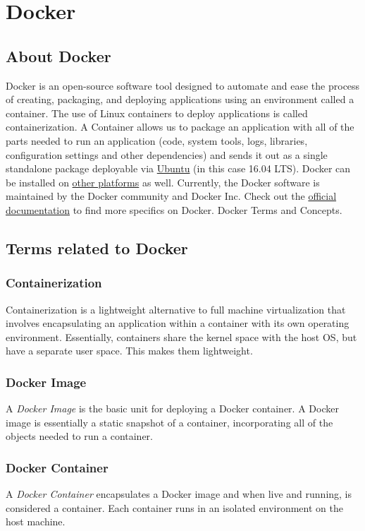 \documentclass[12pt]{article}
\begin{document}
\section{Docker \cite{Docker}}
\subsection{About Docker}
Docker is an open-source software tool designed to automate and ease the process of creating, packaging, and deploying applications using an environment called a container. The use of Linux containers to deploy applications is called containerization. A Container allows us to package an application with all of the parts needed to run an application (code, system tools, logs, libraries, configuration settings and other dependencies) and sends it out as a single standalone package deployable via \href{https://goo.gl/f77a2v}{Ubuntu} (in this case 16.04 LTS). Docker can be installed on \href{https://goo.gl/iTES81}{other platforms} as well. Currently, the Docker software is maintained by the Docker community and Docker Inc. Check out the \href{https://docs.docker.com/}{official documentation} to find more specifics on Docker. Docker Terms and Concepts. 
\subsection{Terms related to Docker}
\subsubsection{Containerization}
Containerization is a lightweight alternative to full machine virtualization that involves encapsulating an application within a container with its own operating environment. Essentially, containers share the kernel space with the host OS, but have a separate user space. This makes them lightweight.
\subsubsection{Docker Image}
A \textit{Docker Image} is the basic unit for deploying a Docker container. A Docker image is essentially a static snapshot of a container, incorporating all of the objects needed to run a container.
\subsubsection{Docker Container}
A \textit{Docker Container} encapsulates a Docker image and when live and running, is considered a container. Each container runs in an isolated environment on the host machine.
\end{document}
